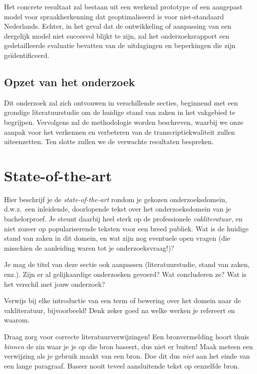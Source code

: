 Het concrete resultaat zal bestaan uit een werkend prototype of een aangepast model voor spraakherkenning dat geoptimaliseerd is voor niet-standaard Nederlands. Echter, in het geval dat de ontwikkeling of aanpassing van een dergelijk model niet succesvol blijkt te zijn, zal het onderzoeksrapport een gedetailleerde evaluatie bevatten van de uitdagingen en beperkingen die zijn geïdentificeerd.

\subsection{Opzet van het onderzoek}
Dit onderzoek zal zich ontvouwen in verschillende secties, beginnend met een grondige literatuurstudie om de huidige stand van zaken in het vakgebied te begrijpen. Vervolgens zal de methodologie worden beschreven, waarbij we onze aanpak voor het verkennen en verbeteren van de transcriptiekwaliteit zullen uiteenzetten. Ten slotte zullen we de verwachte resultaten bespreken.




\section{State-of-the-art}%
\label{sec:state-of-the-art}

Hier beschrijf je de \emph{state-of-the-art} rondom je gekozen onderzoeksdomein, d.w.z.\ een inleidende, doorlopende tekst over het onderzoeksdomein van je bachelorproef. Je steunt daarbij heel sterk op de professionele \emph{vakliteratuur}, en niet zozeer op populariserende teksten voor een breed publiek. Wat is de huidige stand van zaken in dit domein, en wat zijn nog eventuele open vragen (die misschien de aanleiding waren tot je onderzoeksvraag!)?

Je mag de titel van deze sectie ook aanpassen (literatuurstudie, stand van zaken, enz.). Zijn er al gelijkaardige onderzoeken gevoerd? Wat concluderen ze? Wat is het verschil met jouw onderzoek?

Verwijs bij elke introductie van een term of bewering over het domein naar de vakliteratuur, bijvoorbeeld! Denk zeker goed na welke werken je refereert en waarom.

Draag zorg voor correcte literatuurverwijzingen! Een bronvermelding hoort thuis \emph{binnen} de zin waar je je op die bron baseert, dus niet er buiten! Maak meteen een verwijzing als je gebruik maakt van een bron. Doe dit dus \emph{niet} aan het einde van een lange paragraaf. Baseer nooit teveel aansluitende tekst op eenzelfde bron.

